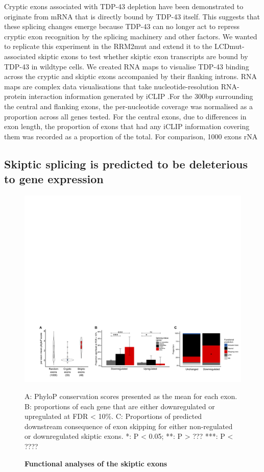 Cryptic exons associated with TDP-43 depletion have been demonstrated to originate from mRNA that is directly bound by TDP-43 itself. This suggests that these splicing changes emerge because TDP-43 can no longer act to repress cryptic exon recognition by the splicing machinery and other factors. We wanted to replicate this experiment in the RRM2mut and extend it to the LCDmut-associated skiptic exons to test whether skiptic exon transcripts are bound by TDP-43 in wildtype cells. We created RNA maps to visualise TDP-43 binding across the cryptic and skiptic exons accompanied by their flanking introns. RNA maps are complex data visualisations that take nucleotide-resolution RNA-protein interaction information generated by iCLIP \citep{Huppertz2014-ip}.For the 300bp surrounding the central and flanking exons, the per-nucleotide coverage was normalised as a proportion across all genes tested. For the central exons, due to differences in exon length, the proportion of exons that had any iCLIP information covering them was recorded as a proportion of the total. For comparison, 1000 exons rNA %

\subsection{Skiptic splicing is predicted to be deleterious to gene expression}

\begin{figure}[h!]
	\begin{center}
		\includegraphics[width=18cm]{Figures/05_tdp_mice/functional_plots.png}
	\end{center}
	\label{functional_plots}
	\caption{\textbf{Functional analyses of the skiptic exons}}
	A: PhyloP conservation scores presented as the mean for each exon. B: proportions of each gene that are either downregulated or upregulated at FDR < 10\%. C: Proportions of predicted downstream consequence of exon skipping for either non-regulated or downregulated skiptic exons. *: P < 0.05; **: P > ??? ***: P < ????
\end{figure}


